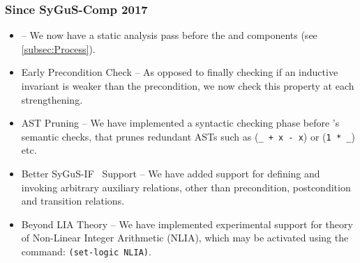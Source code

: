 \documentclass[conference]{IEEEtran}
\begin{document}
\subsubsection*{Since SyGuS-Comp 2017}
\begin{itemize}
    \item \Process{} --
          We now have a static analysis pass before the \Record and \Infer components (see \cref{subsec:Process}).

    \item Early Precondition Check --
          As opposed to finally checking if an inductive invariant is weaker than the precondition,
          we now check this property at each strengthening.

    \item AST Pruning --
          We have implemented a syntactic checking phase before 's semantic checks,
          that prunes redundant ASTs such as (\texttt{\_ + x - x}) or (\texttt{1 * \_}) etc.

    \item Better SyGuS-IF~\citep{Alur2016SyGuSComp2R} Support --
          We have added support for defining and invoking arbitrary auxiliary relations,
          other than precondition, postcondition and transition relations.

    \item Beyond LIA Theory --
          We have implemented experimental support for theory of Non-Linear Integer Arithmetic (NLIA),
          which may be activated using the command: \texttt{(set-logic NLIA)}.
\end{itemize}
\end{document}
